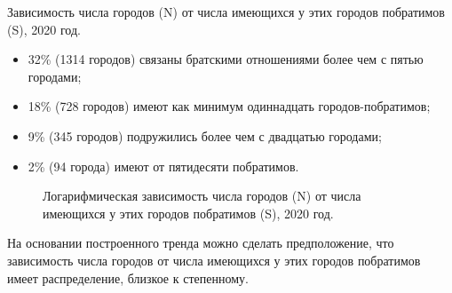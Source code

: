 \begin{marginfigure}[0.0cm]
{
\setlength{\fboxsep}{0pt}%
\setlength{\fboxrule}{1pt}%
}
  \caption{Зависимость числа городов (N) от числа имеющихся у этих городов побратимов (S), 2020 год.}
  \label{fig:city_relation_S_N}
\end{marginfigure}

\begin{itemize}
\item 32\% (\num{1314} городов) связаны братскими отношениями более чем с пятью городами;
\item 18\% (728 городов) имеют как минимум одиннадцать городов-побратимов;
\item 9\% (345 городов) подружились более чем с двадцатью городами;
\item 2\% (94 города) имеют от пятидесяти побратимов.
\end{itemize}

\begin{figure*}[h]
{
\setlength{\fboxsep}{0pt}%
\setlength{\fboxrule}{1pt}%
%
}
  \caption{Логарифмическая зависимость числа городов (N) от числа имеющихся у этих городов побратимов (S), 2020 год.}%
  \label{fig:city_ln_relation_S_N}%
\end{figure*}

На основании построенного тренда можно сделать предположение, что зависимость числа городов от числа имеющихся у этих городов побратимов имеет распределение, близкое к степенному.

